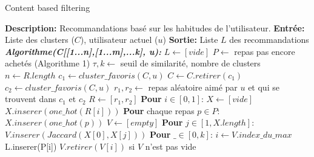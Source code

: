 \documentclass[11pt]{article}
\begin{document}
\begin{algorithm}
    \caption{Content based filtering}
    \begin{algorithmic}[1]
        \Statex \textbf{Description:} Recommandations basé sur les habitudes de l'utilisateur.
        \Statex \textbf{Entrée:} Liste des clusters ($C$), utilisateur actuel ($u$)
        \Statex \textbf{Sortie:} Liste $L$ des recommandations
        \State \textbf{\textit{Algorithme(C[[1...n],[1...m],...k], u):}}
        \State \hspace{0.5cm} $L \leftarrow [vide]$
        \State \hspace{0.5cm} $P \leftarrow$ repas pas encore achetés (Algorithme 1)
        \State \hspace{0.5cm} $\tau,k \leftarrow$ seuil de similarité, nombre de clusters
        \State \hspace{0.5cm} $n \leftarrow R.length$
        \State \hspace{0.5cm} $c_1 \leftarrow cluster\_favoris(C, u)$
        \State \hspace{0.5cm} $C \leftarrow C.retirer(c_1)$
        \State \hspace{0.5cm} $c_2 \leftarrow cluster\_favoris(C, u)$
        \State \hspace{0.5cm} $r_1, r_2 \leftarrow$ repas aléatoire aimé par $u$ et qui se trouvent dans $c_1$ et $c_2$
        \State \hspace{0.5cm} $R \leftarrow [r_1, r_2]$
        \State \hspace{0.5cm} \textbf{Pour} $i \in [0,1]$:
        \State \hspace{1cm} $X \leftarrow [vide]$ 
        \State \hspace{1cm} $X.inserer(one\_hot(R[i]))$
        \State \hspace{1cm} \textbf{Pour} chaque repas $p \in P$:
        \State \hspace{1.5cm} $X.inserer(one\_hot(p))$
        \State \hspace{1cm} $V \leftarrow [empty]$
        \State \hspace{1cm} \textbf{Pour} $j \in [1, X.length]$:
        \State \hspace{1.5cm} $V.inserer(Jaccard(X[0], X[j]))$
        \State \hspace{1cm} \textbf{Pour} $\_ \in [0, k]$:
        \State \hspace{1.5cm} $i \leftarrow V.index\_du\_max$
        \State \hspace{1.5cm} L.inserer(P[i])
        \State \hspace{1.5cm} $V.retirer(V[i])$ si $V$ n'est pas vide
        

\end{algorithmic}
\end{algorithm}
\end{document}
